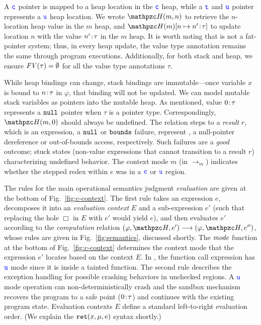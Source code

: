 {
A $\textcolor{blue}{\texttt{c}}$ pointer is mapped to a heap location in the $\textcolor{blue}{\texttt{c}}$ heap, 
while a $\textcolor{blue}{\texttt{t}}$ and $\textcolor{blue}{\texttt{u}}$ pointer represents a $\textcolor{blue}{\texttt{u}}$ heap location.
We wrote $\heap(m,n)$ to retrieve the $n$-location heap value in the $m$ heap,
and $\heapup{m}{n}{\evalue{n'}{\tau}}$ 
to update location $n$ with the value ${n'}\!:\!{\tau}$ in the $m$ heap.
It is worth noting that \systemname is not a fat-pointer system;
thus, in every heap update, the value type annotation remains the same through program executions.
% 
% 
Additionally, for both stack and heap, 
we ensure $\mathit{FV}(\tau)=\emptyset$ for all the value type annotations $\tau$.

While heap bindings can change, stack bindings are immutable---once
variable $x$ is bound to ${n}\!:\!{\tau}$ in $\varphi$, that binding will not
be updated. 
We can model mutable stack variables as pointers into the
mutable heap.
As mentioned, value ${0}\!:\!{\tau}$
represents a $\mathtt{null}$ pointer when $\tau$ is a pointer type.
Correspondingly, $\heap(m,0)$ should always be undefined.
% 
The relation steps to a \emph{result} $r$, which is   an
expression, a $\mathtt{null}$ or $\mathtt{bounds}$ failure, represent , a null-pointer dereference or out-of-bounds access,
respectively.
% 
Such failures are a \emph{good} outcome; stuck states
(non-value expressions that cannot transition to a result $r$)
characterizing undefined behavior.
%
% 
The context mode $m$ (in $\longrightarrow_{m}$) indicates whether the
stepped redex within $e$ was in a $\textcolor{blue}{\texttt{c}}$ or $\textcolor{blue}{\texttt{u}}$ region.

The rules for the main operational semantics
judgment \emph{evaluation} are given at the bottom of
Fig.~\ref{fig:c-context}.
The first rule takes an expression $e$, decomposes
it into an \emph{evaluation context} $E$ and a sub-expression $e'$
(such that replacing the hole $\Box$ in $E$ with $e'$ would yield
$e$), and then evaluates $e'$ according to the \emph{computation}
  relation $(\varphi,\heap,e') \longrightarrow (\varphi,\heap,e'')$,
whose rules are given in Fig.~\ref{fig:semantics}, discussed
shortly.
The $\textit{mode}$ function  at the bottom of Fig.~\ref{fig:c-context}
determines the context mode that the expression $e'$ locates based on the context $E$.
In , the function call expression  has $\textcolor{blue}{\texttt{u}}$ mode since it is inside a tainted function.
The second rule describes the exception handling 
for possible crashing behaviors in unchecked regions.
A $\textcolor{blue}{\texttt{u}}$ mode operation can non-deterministically crash
and the \systemname sandbox mechanism recovers
the program to a safe point (${0}\!:\!{\tau}$)
and continues with the existing program state.
Evaluation contexts $E$ define a standard left-to-right evaluation order. (We explain the
$\mathtt{ret}({x},{\mu},{e})$ syntax shortly.)

}
